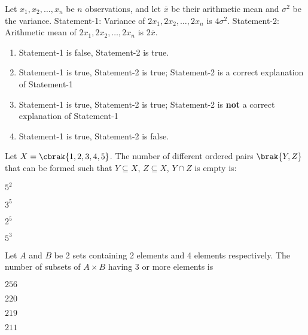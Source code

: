     \item Let $x_1, x_2, \dots, x_n$ be $n$ observations, and let $\overline{x}$ be their arithmetic mean and $\sigma^{2}$ be the variance.\newline
    Statement-1: Variance of $2x_1, 2x_2, \dots, 2x_n$ is $4\sigma^{2}$.\newline
    Statement-2: Arithmetic mean of $2x_1, 2x_2, \dots, 2x_n$ is $2\overline{x}$.
    
    \hfill{}
    \begin{enumerate}
        \item Statement-1 is false, Statement-2 is true.
        \item Statement-1 is true, Statement-2 is true; Statement-2 is a correct explanation of Statement-1
        \item Statement-1 is true, Statement-2 is true; Statement-2 is \textbf{not} a correct explanation of Statement-1
        \item Statement-1 is true, Statement-2 is false.
    \end{enumerate}
    
    \item Let $X = \cbrak{1, 2, 3, 4, 5}$. The number of different ordered pairs $\brak{Y, Z}$ that can be formed such that $Y \subseteq X$, $Z \subseteq X$, $Y \cap Z$ is empty is:
    
    \hfill{}
    \begin{enumerate}
    \begin{multicols}{4}
        \item $5^2$
        \item $3^5$
        \item $2^5$
        \item $5^3$
    \end{multicols}
    \end{enumerate}
    
    \item Let $A$ and $B$ be 2 sets containing 2 elements and 4 elements respectively. The number of subsets of $A \times B$ having 3 or more elements is
    
    \hfill{}
    \begin{enumerate}
    \begin{multicols}{4}
        \item $256$
        \item $220$
        \item $219$
        \item $211$
    \end{multicols}
    \end{enumerate}
    
